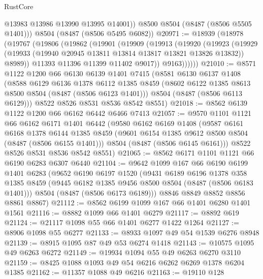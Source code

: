 \begin{lexlean}{RustCore}
\begin{coremodule}
          @13983
          @13986
          @13990
          @13995
          @14001))
      @8500
      @8504
      (@8487 (@8506 @5505 @1401)))
    @8504
    (@8487 (@8506 @5495 @6082))
@20971 := @18939
    (@18978
      (@19767
        (@19806
          (@19862
            (@19901
              (@19909
                (@19913
                  (@19920
                    (@19923
                      (@19929
                        (@19933 (@19940 @20945 @13811 @13814 @13817 @13821 @13826 @13832))
                        @8989))
                    @11393
                    @11396
                    @11399
                    @11402
                    @9017))
                @9163))))))
@21010 := @8571
    @1122
    @1200
    @66
    @6130
    @6139
    @1401
    @7415
    (@8581
      @6130
      @6137
      @1408
      (@8588
        @6129
        @6136
        @1378
        @6112
        @1385
        @8459
        (@8602 @6122 @1385 @8613 @8500 @8504 (@8487 (@8506 @6123 @1401)))
        @8504
        (@8487 (@8506 @6113 @6129)))
      @8522
      @8526
      @8531
      @8536
      @8542
      @8551)
@21018 := @8562 @6139 @1122 @1200 @66 @6162 @6442 @6466 @7413
@21057 := @9570
    @1101
    @1121
    @66
    @6162
    @6171
    @1401
    @6442
    (@9580
      @6162
      @6169
      @1408
      (@9587
        @6161
        @6168
        @1378
        @6144
        @1385
        @8459
        (@9601 @6154 @1385 @9612 @8500 @8504 (@8487 (@8506 @6155 @1401)))
        @8504
        (@8487 (@8506 @6145 @6161)))
      @8522
      @8526
      @8531
      @8536
      @8542
      @8551)
@21065 := @8562 @6171 @1101 @1121 @66 @6190 @6283 @6307 @6440
@21104 := @9642
    @1099
    @167
    @66
    @6190
    @6199
    @1401
    @6283
    (@9652
      @6190
      @6197
      @1520
      (@9431
        @6189
        @6196
        @1378
        @358
        @1385
        @8459
        (@9445 @6182 @1385 @9456 @8500 @8504 (@8487 (@8506 @6183 @1401)))
        @8504
        (@8487 (@8506 @6173 @6189)))
      @8846
      @8849
      @8852
      @8856
      @8861
      @8867)
@21112 := @8562 @6199 @1099 @167 @66 @1401 @6280 @1401 @1561
@21116 := @8882 @1099 @66 @1401 @6279
@21117 := @8892 @619
@21124 := @21117 @1098 @55 @66 @1401 @6277 @1422 @1264
@21127 := @8906 @1098 @55 @6277
@21133 := @8933 @1097 @49 @54 @1539 @6276 @8948
@21139 := @8915 @1095 @87 @49 @53 @6274 @1418
@21143 := @10575 @1095 @49 @6263 @6272
@21149 := @19934 @1094 @55 @49 @6263 @6270 @3110
@21159 := @8425 @1088 @1093 @49 @54 @6216 @6262 @6269 @1378 @6204 @1385
@21162 := @11357 @1088 @49 @6216
@21163 := @19110 @128

\end{coremodule}
\end{lexlean}
